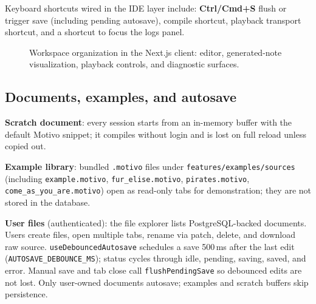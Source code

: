 Keyboard shortcuts wired in the IDE layer include: \textbf{Ctrl/Cmd+S} flush or trigger save (including pending
autosave), compile shortcut, playback transport shortcut, and a shortcut to focus the logs panel.

\begin{figure}[htbp]
  \centering
  \caption{Workspace organization in the Next.js client: editor, generated-note visualization, playback controls, and
  diagnostic surfaces.}\label{fig:studio-workspace}
\end{figure}

\subsection{Documents, examples, and autosave}\label{subsec:files-autosave}

\textbf{Scratch document}: every session starts from an in-memory buffer with the default Motivo snippet; it compiles
without login and is lost on full reload unless copied out.

\textbf{Example library}: bundled \texttt{.motivo} files under \texttt{features/examples/sources} (including
\texttt{example.motivo}, \texttt{fur\_elise.motivo}, \texttt{pirates.motivo}, \texttt{come\_as\_you\_are.motivo}) open
as read-only tabs for demonstration; they are not stored in the database.

\textbf{User files} (authenticated): the file explorer lists PostgreSQL-backed documents.
Users create files, open multiple tabs, rename via patch, delete, and download raw source.
\texttt{useDebouncedAutosave} schedules a save 500\,ms after the last edit (\texttt{AUTOSAVE\_DEBOUNCE\_MS}); status
cycles through idle, pending, saving, saved, and error.
Manual save and tab close call \texttt{flushPendingSave} so debounced edits are not lost.
Only user-owned documents autosave; examples and scratch buffers skip persistence.

